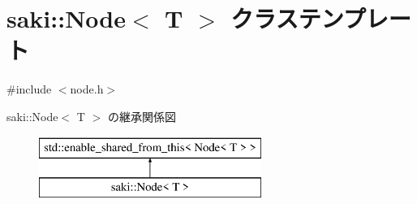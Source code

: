\hypertarget{classsaki_1_1_node}{}\section{saki\+:\+:Node$<$ T $>$ クラステンプレート}
\label{classsaki_1_1_node}


{\ttfamily \#include $<$node.\+h$>$}

saki\+:\+:Node$<$ T $>$ の継承関係図\begin{figure}[H]
\begin{center}
\leavevmode
\includegraphics[height=2.000000cm]{classsaki_1_1_node}
\end{center}
\end{figure}
